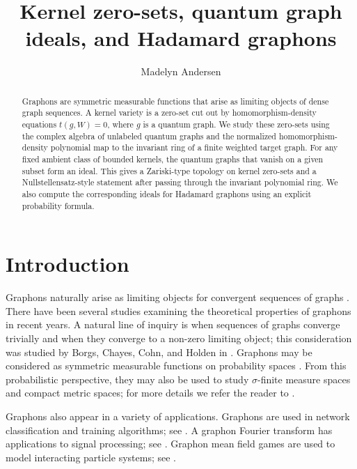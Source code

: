 \documentclass[a4paper,12pt]{article}
\title{Kernel zero-sets, quantum graph ideals, and Hadamard graphons}
\author{Madelyn Andersen}
\let\cite\parencite
\theoremstyle{definition}
\begin{document}
\maketitle

\begin{abstract}
Graphons are symmetric measurable functions that arise as limiting objects of dense graph sequences. A kernel variety is a zero-set cut out by homomorphism-density equations $t(g,W)=0$, where $g$ is a quantum graph. We study these zero-sets using the complex algebra of unlabeled quantum graphs and the normalized homomorphism-density polynomial map to the invariant ring of a finite weighted target graph. For any fixed ambient class of bounded kernels, the quantum graphs that vanish on a given subset form an ideal. This gives a Zariski-type topology on kernel zero-sets and a Nullstellensatz-style statement after passing through the invariant polynomial ring. We also compute the corresponding ideals for Hadamard graphons using an explicit probability formula.
\end{abstract}


\section{Introduction}\label{section: Intro}

Graphons naturally arise as limiting objects for convergent sequences of graphs \cite{glasscock2015graphon, glasscock2016graphon, hombook, BORGS20081801}. There have been several studies examining the theoretical properties of graphons in recent years. A natural line of inquiry is when sequences of graphs converge trivially and when they converge to a non-zero limiting object; this consideration was studied by Borgs, Chayes, Cohn, and Holden in \cite{borgs2018sparse}. Graphons may be considered as symmetric measurable functions on probability spaces \cite{hombook, borgs2010left}. From this probabilistic perspective, they may also be used to study $\sigma$-finite measure spaces and compact metric spaces; for more details we refer the reader to \cite{janson2016graphons, glasscock2015graphon, borgs2010left, borgs2018sparse}.

Graphons also appear in a variety of applications. Graphons are used in network classification and training algorithms; see \cite{sabanayagam2021graphon, hu2021training, maskey2021transferability, xu2021learning, ruiz2020graphon, ruiz2021graph}. A graphon Fourier transform has applications to signal processing; see \cite{2021, ghandehari2021noncommutative}. Graphon mean field games are used to model interacting particle systems; see \cite{bayraktar2021graphon, bayraktar2021graphons, gao2021lqg, aurell2021stochastic, bassino2021random, gao2021, athreya2019graphonvalued, vasal2020sequential}.
\end{document}
